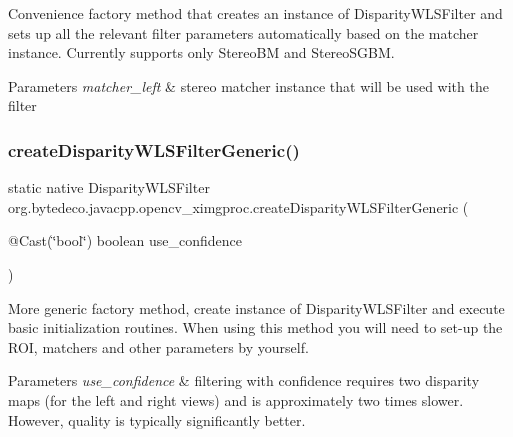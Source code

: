 Convenience factory method that creates an instance of Disparity\+W\+L\+S\+Filter and sets up all the relevant filter parameters automatically based on the matcher instance. Currently supports only Stereo\+BM and Stereo\+S\+G\+BM. 


\begin{DoxyParams}{Parameters}
{\em matcher\+\_\+left} & stereo matcher instance that will be used with the filter \\
\hline
\end{DoxyParams}
\mbox{\label{group__ximgproc__filters_ga4ecf158eb4378bda624a77b7afe92c9b}} 
\subsubsection{\texorpdfstring{create\+Disparity\+W\+L\+S\+Filter\+Generic()}{createDisparityWLSFilterGeneric()}}
{\footnotesize\ttfamily static native Disparity\+W\+L\+S\+Filter org.\+bytedeco.\+javacpp.\+opencv\+\_\+ximgproc.\+create\+Disparity\+W\+L\+S\+Filter\+Generic (\begin{DoxyParamCaption}\item[{@Cast(\char`\"{}bool\char`\"{}) boolean}]{use\+\_\+confidence }\end{DoxyParamCaption})\hspace{0.3cm}{\ttfamily [static]}}



More generic factory method, create instance of Disparity\+W\+L\+S\+Filter and execute basic initialization routines. When using this method you will need to set-\/up the R\+OI, matchers and other parameters by yourself. 


\begin{DoxyParams}{Parameters}
{\em use\+\_\+confidence} & filtering with confidence requires two disparity maps (for the left and right views) and is approximately two times slower. However, quality is typically significantly better. \\
\hline
\end{DoxyParams}
\mbox{\label{group__ximgproc__filters_ga813031e38babc7f53070fcf67dbfea40}} 
